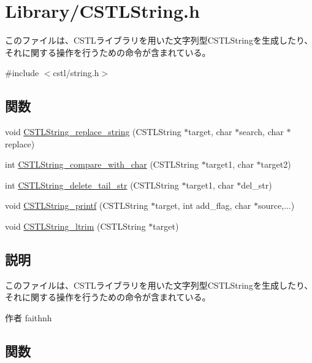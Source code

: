 \section{Library/CSTLString.h}
\label{CSTLString_8h}


このファイルは、CSTLライブラリを用いた文字列型CSTLStringを生成したり、それに関する操作を行うための命令が含まれている。  


{\ttfamily \#include $<$cstl/string.h$>$}\par
\subsection*{関数}
\begin{DoxyCompactItemize}
\item 
void \hyperlink{CSTLString_8h_a18e26d83587b82c192fdee06afe130ec}{CSTLString\_\-replace\_\-string} (CSTLString $\ast$target, char $\ast$search, char $\ast$replace)
\item 
int \hyperlink{CSTLString_8h_afc5ade5716a279fc0576b75f933b19a9}{CSTLString\_\-compare\_\-with\_\-char} (CSTLString $\ast$target1, char $\ast$target2)
\item 
int \hyperlink{CSTLString_8h_a1625e5156ceff6f2f505600d574757ae}{CSTLString\_\-delete\_\-tail\_\-str} (CSTLString $\ast$target1, char $\ast$del\_\-str)
\item 
void \hyperlink{CSTLString_8h_af2fe29138e25738a297f48a95dc741c6}{CSTLString\_\-printf} (CSTLString $\ast$target, int add\_\-flag, char $\ast$source,...)
\item 
void \hyperlink{CSTLString_8h_ad2c259b0d8fa85264f32cad8eaf05c00}{CSTLString\_\-ltrim} (CSTLString $\ast$target)
\end{DoxyCompactItemize}


\subsection{説明}
このファイルは、CSTLライブラリを用いた文字列型CSTLStringを生成したり、それに関する操作を行うための命令が含まれている。 \begin{DoxyAuthor}{作者}
faithnh 
\end{DoxyAuthor}


\subsection{関数}
